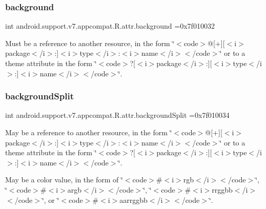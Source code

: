 \subsubsection{\texorpdfstring{background}{background}}
{\footnotesize\ttfamily int android.\+support.\+v7.\+appcompat.\+R.\+attr.\+background =0x7f010032\hspace{0.3cm}{\ttfamily [static]}}

Must be a reference to another resource, in the form \char`\"{}$<$code$>$@\mbox{[}+\mbox{]}\mbox{[}$<$i$>$package$<$/i$>$\+:\mbox{]}$<$i$>$type$<$/i$>$\+:$<$i$>$name$<$/i$>$$<$/code$>$\char`\"{} or to a theme attribute in the form \char`\"{}$<$code$>$?\mbox{[}$<$i$>$package$<$/i$>$\+:\mbox{]}\mbox{[}$<$i$>$type$<$/i$>$\+:\mbox{]}$<$i$>$name$<$/i$>$$<$/code$>$\char`\"{}. \mbox{\label{classandroid_1_1support_1_1v7_1_1appcompat_1_1R_1_1attr_a39a8f294508e3340e83275f406757bfc}} 
\subsubsection{\texorpdfstring{background\+Split}{backgroundSplit}}
{\footnotesize\ttfamily int android.\+support.\+v7.\+appcompat.\+R.\+attr.\+background\+Split =0x7f010034\hspace{0.3cm}{\ttfamily [static]}}

May be a reference to another resource, in the form \char`\"{}$<$code$>$@\mbox{[}+\mbox{]}\mbox{[}$<$i$>$package$<$/i$>$\+:\mbox{]}$<$i$>$type$<$/i$>$\+:$<$i$>$name$<$/i$>$$<$/code$>$\char`\"{} or to a theme attribute in the form \char`\"{}$<$code$>$?\mbox{[}$<$i$>$package$<$/i$>$\+:\mbox{]}\mbox{[}$<$i$>$type$<$/i$>$\+:\mbox{]}$<$i$>$name$<$/i$>$$<$/code$>$\char`\"{}. 

May be a color value, in the form of \char`\"{}$<$code$>$\#$<$i$>$rgb$<$/i$>$$<$/code$>$\char`\"{}, \char`\"{}$<$code$>$\#$<$i$>$argb$<$/i$>$$<$/code$>$\char`\"{}, \char`\"{}$<$code$>$\#$<$i$>$rrggbb$<$/i$>$$<$/code$>$\char`\"{}, or \char`\"{}$<$code$>$\#$<$i$>$aarrggbb$<$/i$>$$<$/code$>$\char`\"{}. \mbox{\label{classandroid_1_1support_1_1v7_1_1appcompat_1_1R_1_1attr_a917a60116d782ec096fb8ca79630cb1e}} 
